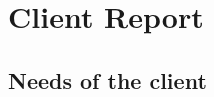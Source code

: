 \documentclass{article}
\begin{document}
\section{Client Report}


\bigskip
\subsection{Needs of the client}
\end{document}
